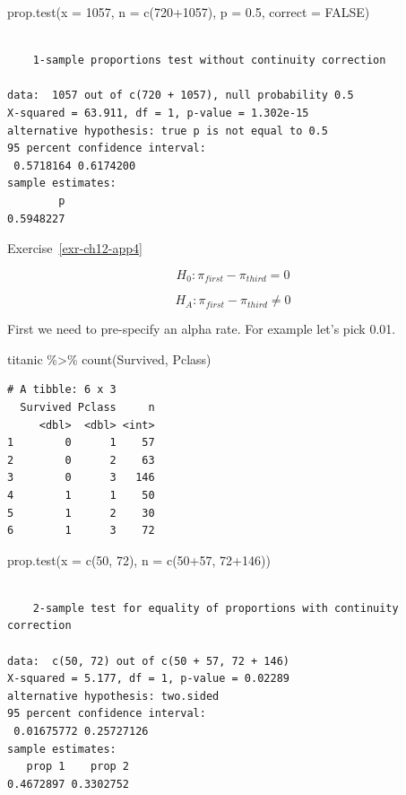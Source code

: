 \documentclass[
  letterpaper,
  DIV=11,
  numbers=noendperiod]{scrreprt}
\newenvironment{Shaded}{\begin{snugshade}}{\end{snugshade}}
\newcommand{\AttributeTok}[1]{\textcolor[rgb]{0.40,0.45,0.13}{#1}}
\newcommand{\ConstantTok}[1]{\textcolor[rgb]{0.56,0.35,0.01}{#1}}
\newcommand{\DecValTok}[1]{\textcolor[rgb]{0.68,0.00,0.00}{#1}}
\newcommand{\FloatTok}[1]{\textcolor[rgb]{0.68,0.00,0.00}{#1}}
\newcommand{\FunctionTok}[1]{\textcolor[rgb]{0.28,0.35,0.67}{#1}}
\newcommand{\NormalTok}[1]{\textcolor[rgb]{0.00,0.23,0.31}{#1}}
\newcommand{\SpecialCharTok}[1]{\textcolor[rgb]{0.37,0.37,0.37}{#1}}
\theoremstyle{definition}
\theoremstyle{remark}
\begin{document}
\begin{Shaded}
\begin{Highlighting}[]
\FunctionTok{prop.test}\NormalTok{(}\AttributeTok{x =} \DecValTok{1057}\NormalTok{, }\AttributeTok{n =} \FunctionTok{c}\NormalTok{(}\DecValTok{720}\SpecialCharTok{+}\DecValTok{1057}\NormalTok{), }\AttributeTok{p =} \FloatTok{0.5}\NormalTok{, }\AttributeTok{correct =} \ConstantTok{FALSE}\NormalTok{)}
\end{Highlighting}
\end{Shaded}

\begin{verbatim}

    1-sample proportions test without continuity correction

data:  1057 out of c(720 + 1057), null probability 0.5
X-squared = 63.911, df = 1, p-value = 1.302e-15
alternative hypothesis: true p is not equal to 0.5
95 percent confidence interval:
 0.5718164 0.6174200
sample estimates:
        p 
0.5948227 
\end{verbatim}

Exercise~\ref{exr-ch12-app4}

\[H_0: \pi_{first} - \pi_{third} = 0\]

\[H_A: \pi_{first} - \pi_{third} \ne 0\]

First we need to pre-specify an alpha rate. For example let's pick 0.01.

\begin{Shaded}
\begin{Highlighting}[]
\NormalTok{titanic }\SpecialCharTok{\%\textgreater{}\%} 
  \FunctionTok{count}\NormalTok{(Survived, Pclass)}
\end{Highlighting}
\end{Shaded}

\begin{verbatim}
# A tibble: 6 x 3
  Survived Pclass     n
     <dbl>  <dbl> <int>
1        0      1    57
2        0      2    63
3        0      3   146
4        1      1    50
5        1      2    30
6        1      3    72
\end{verbatim}

\begin{Shaded}
\begin{Highlighting}[]
\FunctionTok{prop.test}\NormalTok{(}\AttributeTok{x =} \FunctionTok{c}\NormalTok{(}\DecValTok{50}\NormalTok{, }\DecValTok{72}\NormalTok{), }\AttributeTok{n =} \FunctionTok{c}\NormalTok{(}\DecValTok{50}\SpecialCharTok{+}\DecValTok{57}\NormalTok{, }\DecValTok{72}\SpecialCharTok{+}\DecValTok{146}\NormalTok{))}
\end{Highlighting}
\end{Shaded}

\begin{verbatim}

    2-sample test for equality of proportions with continuity correction

data:  c(50, 72) out of c(50 + 57, 72 + 146)
X-squared = 5.177, df = 1, p-value = 0.02289
alternative hypothesis: two.sided
95 percent confidence interval:
 0.01675772 0.25727126
sample estimates:
   prop 1    prop 2 
0.4672897 0.3302752 
\end{verbatim}
\end{document}
